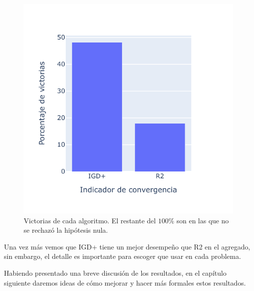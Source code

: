 \begin{figure}[H]
    \centering
    \includegraphics[scale=.7]{Figuras/R2_vs_IGDp.pdf}
    \caption[Victorias por algoritmo]{Victorias de cada algoritmo. El restante del $100\%$ son en las que no se rechazó la hipótesis nula.}
    \label{fig:R2_IGDp}
\end{figure}


Una vez más vemos que IGD+ tiene un mejor desempeño que R2 en el agregado, sin embargo, el detalle es importante para escoger que usar en cada problema. 

Habiendo presentado una breve discusión de los resultados, en el capítulo siguiente daremos ideas de cómo mejorar y hacer más formales estos resultados. 



